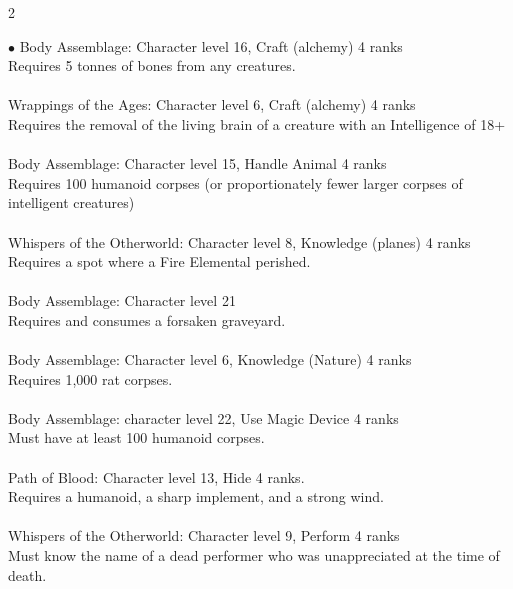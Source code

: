 \begin{multicols}{2}
\begin{small}
\begin{list}{$\bullet$}{\itemspace}
Body Assemblage: Character level 16, Craft (alchemy) 4 ranks\\
Requires 5 tonnes of bones from any creatures.\\
\\
Wrappings of the Ages: Character level 6, Craft (alchemy) 4 ranks\\
Requires the removal of the living brain of a creature with an Intelligence of 18+\\
\\
Body Assemblage: Character level 15, Handle Animal 4 ranks\\
Requires 100 humanoid corpses (or proportionately fewer larger corpses of intelligent creatures)\\
\\
Whispers of the Otherworld: Character level 8, Knowledge (planes) 4 ranks\\
Requires a spot where a Fire Elemental perished.\\
\\
Body Assemblage: Character level 21\\
Requires and consumes a forsaken graveyard.\\
\\
Body Assemblage: Character level 6, Knowledge (Nature) 4 ranks\\
Requires 1,000 rat corpses.\\
\\
Body Assemblage: character level 22, Use Magic Device 4 ranks\\
Must have at least 100 humanoid corpses.\\
\\
Path of Blood: Character level 13, Hide 4 ranks.\\
Requires a humanoid, a sharp implement, and a strong wind.\\
\\
Whispers of the Otherworld: Character level 9, Perform 4 ranks\\
Must know the name of a dead performer who was unappreciated at the time of death.\\
\\

\end{list}
\end{small}
\end{multicols}
